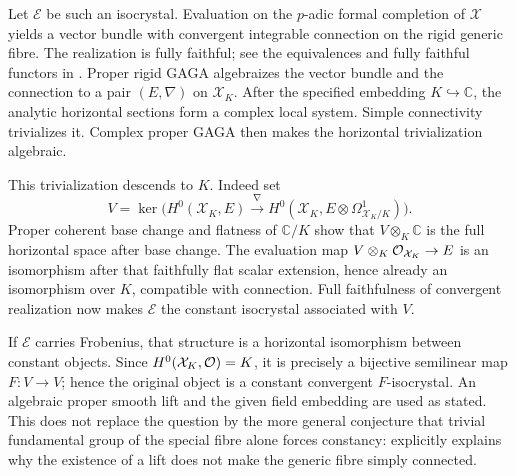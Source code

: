 Let $\mathcal E$ be such an isocrystal.  Evaluation on the $p$-adic formal completion of $\mathcal X$ yields a vector bundle with convergent integrable connection on the rigid generic fibre.  The realization is fully faithful; see the equivalences and fully faithful functors in \cite[\S1, (1.13), (1.24)--(1.26)]{EsnaultShiho2018}.  Proper rigid GAGA algebraizes the vector bundle and the connection to a pair $(E,\nabla)$ on $\mathcal X_K$.  After the specified embedding $K\hookrightarrow\mathbb C$, the analytic horizontal sections form a complex local system.  Simple connectivity trivializes it.  Complex proper GAGA then makes the horizontal trivialization algebraic.

This trivialization descends to $K$.  Indeed set
\[
 V=\ker\bigl(H^0(\mathcal X_K,E)\xrightarrow{\nabla}
                H^0(\mathcal X_K,E\otimes\Omega^1_{\mathcal X_K/K})\bigr).
\]
Proper coherent base change and flatness of $\mathbb C/K$ show that $V\otimes_K\mathbb C$ is the full horizontal space after base change.  The evaluation map $V\otimes_K\mathcal O_{\mathcal X_K}\to E$ is an isomorphism after that faithfully flat scalar extension, hence already an isomorphism over $K$, compatible with connection.  Full faithfulness of convergent realization now makes $\mathcal E$ the constant isocrystal associated with $V$.

If $\mathcal E$ carries Frobenius, that structure is a horizontal isomorphism between constant objects.  Since $H^0(\mathcal X_K,\mathcal O)=K$, it is precisely a bijective semilinear map $F:V\to V$; hence the original object is a constant convergent $F$-isocrystal.  An algebraic proper smooth lift and the given field embedding are used as stated.  This does not replace the question by the more general conjecture that trivial \etale fundamental group of the special fibre alone forces constancy: \cite[Introduction]{EsnaultShiho2018} explicitly explains why the existence of a lift does not make the generic fibre simply connected.


